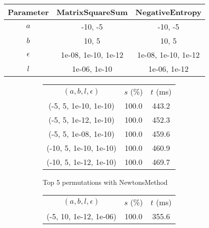 \begin{center}
\label{tab:params_FibonacciSearch}
\begin{tabular}{|c|c|c|}
\hline
\rowcolor{gray!25}
Parameter & MatrixSquareSum & NegativeEntropy \\
\hline
$a$ & -10, -5 & -10, -5 \\
$b$ & 10, 5 & 10, 5 \\
$\epsilon$ & 1e-08, 1e-10, 1e-12 & 1e-08, 1e-10, 1e-12 \\
$l$ & 1e-06, 1e-10 & 1e-06, 1e-12 \\
\hline
\end{tabular}
\end{center}

\begin{figure}[H]
\label{fig:param_comp_MatrixSquareSum_FibonacciSearch}
\begin{subfigure}[ht]{.5\textwidth}
\begin{tabular}{|c|c|c|}
\hline
\rowcolor{gray!25}
\multicolumn{3}{|c|}{NewtonsMethod} \\
\hline
\rowcolor{gray!25}
$(a,b,l,\epsilon)$ & $s$ (\%) & $t$ (ms) \\
\hline
(-5, 5, 1e-10, 1e-10) & 100.0 & 443.2 \\
(-5, 5, 1e-12, 1e-10) & 100.0 & 452.3 \\
(-5, 5, 1e-08, 1e-10) & 100.0 & 459.6 \\
(-10, 5, 1e-10, 1e-10) & 100.0 & 460.9 \\
(-10, 5, 1e-12, 1e-10) & 100.0 & 469.7 \\
\hline
\end{tabular}
\caption{Top 5 permutations with NewtonsMethod}
\label{subfig:param_comp_MatrixSquareSum_NewtonsMethod_FibonacciSearch}
\end{subfigure}
\hfill
\begin{subfigure}[ht]{.5\textwidth}
\begin{tabular}{|c|c|c|}
\hline
\rowcolor{gray!25}
\multicolumn{3}{|c|}{GradientDescentMethod} \\
\hline
\rowcolor{gray!25}
$(a,b,l,\epsilon)$ & $s$ (\%) & $t$ (ms) \\
\hline
(-5, 10, 1e-12, 1e-06) & 100.0 & 355.6 \\

\end{tabular}
\end{subfigure}
\end{figure}
